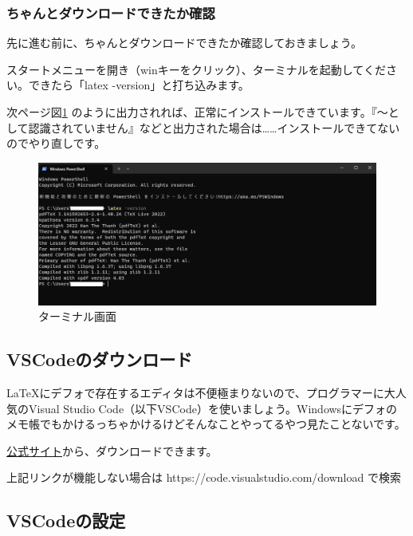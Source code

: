 \documentclass[uplatex,dvipdfmx]{jsarticle}
\numberwithin{equation}{section}
\begin{document}
\subsubsection{ちゃんとダウンロードできたか確認}
先に進む前に、ちゃんとダウンロードできたか確認しておきましょう。

スタートメニューを開き（winキーをクリック）、ターミナルを起動してください。できたら「latex -version」と打ち込みます。

次ページ図\ref{fig:powershell} のように出力されれば、正常にインストールできています。『～として認識されていません』などと出力された場合は……インストールできてないのでやり直しです。
\begin{figure}[htbp]
  \centering
  \includegraphics[width=0.7\linewidth]{powershell.png}
  \caption{ターミナル画面}
  \label{fig:powershell}
\end{figure}
\subsection{VSCodeのダウンロード}
\LaTeX にデフォで存在するエディタは不便極まりないので、プログラマーに大人気のVisual Studio Code（以下VSCode）を使いましょう。Windowsにデフォのメモ帳でもかけるっちゃかけるけどそんなことやってるやつ見たことないです。

\href{https://code.visualstudio.com/download}{公式サイト}から、ダウンロードできます。

上記リンクが機能しない場合は https://code.visualstudio.com/download で検索
\subsection{VSCodeの設定}
\end{document}
